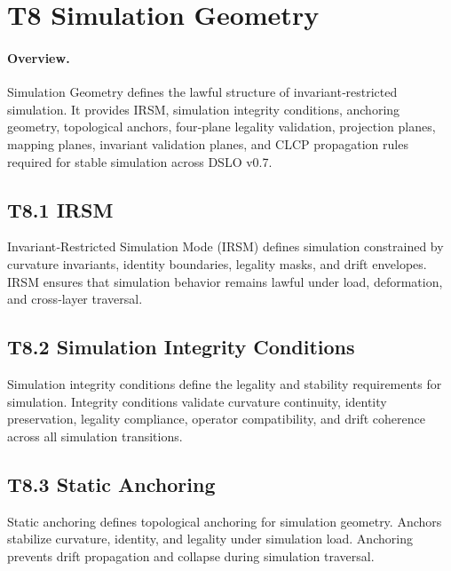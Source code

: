 
\section{T8 Simulation Geometry}

\paragraph{Overview.}
Simulation Geometry defines the lawful structure of invariant‑restricted
simulation. It provides IRSM, simulation integrity conditions, anchoring
geometry, topological anchors, four‑plane legality validation, projection
planes, mapping planes, invariant validation planes, and CLCP propagation rules
required for stable simulation across DSLO v0.7.

\subsection{T8.1 IRSM}
Invariant‑Restricted Simulation Mode (IRSM) defines simulation constrained by
curvature invariants, identity boundaries, legality masks, and drift envelopes.
IRSM ensures that simulation behavior remains lawful under load, deformation,
and cross‑layer traversal.

\subsection{T8.2 Simulation Integrity Conditions}
Simulation integrity conditions define the legality and stability requirements
for simulation. Integrity conditions validate curvature continuity, identity
preservation, legality compliance, operator compatibility, and drift coherence
across all simulation transitions.

\subsection{T8.3 Static Anchoring}
Static anchoring defines topological anchoring for simulation geometry. Anchors
stabilize curvature, identity, and legality under simulation load. Anchoring
prevents drift propagation and collapse during simulation traversal.

